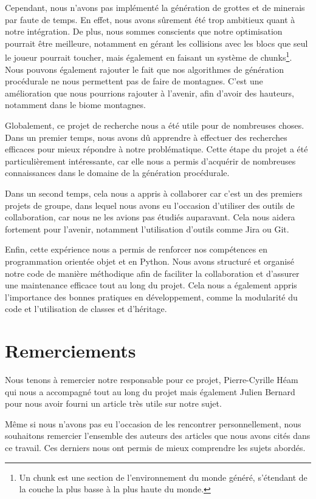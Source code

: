 \documentclass[12pt]{article}
\begin{document}
Cependant, nous n'avons pas implémenté la génération de grottes et de minerais par faute de temps. En effet, nous avons sûrement été trop ambitieux quant à notre intégration. De plus, nous sommes conscients que notre optimisation pourrait être meilleure, notamment en gérant les collisions avec les blocs que seul le joueur pourrait toucher, mais également en faisant un système de chunks\footnote{Un chunk est une section de l’environnement du monde généré, s’étendant de la couche la plus basse à la plus haute du monde.}. Nous pouvons également rajouter le fait que nos algorithmes de génération procédurale ne nous permettent pas de faire de montagnes. C'est une amélioration que nous pourrions rajouter à l'avenir, afin d'avoir des hauteurs, notamment dans le biome montagnes.

Globalement, ce projet de recherche nous a été utile pour de nombreuses choses. Dans un premier temps, nous avons dû apprendre à effectuer des recherches efficaces pour mieux répondre à notre problématique. Cette étape du projet a été particulièrement intéressante, car elle nous a permis d’acquérir de nombreuses connaissances dans le domaine de la génération procédurale.\par
Dans un second temps, cela nous a appris à collaborer car c'est un des premiers projets de groupe, dans lequel nous avons eu l'occasion d'utiliser des outils de collaboration, car nous ne les avions pas étudiés auparavant. Cela nous aidera fortement pour l'avenir, notamment l'utilisation d'outils comme Jira ou Git.\par
Enfin, cette expérience nous a permis de renforcer nos compétences en programmation orientée objet et en Python. Nous avons structuré et organisé notre code de manière méthodique afin de faciliter la collaboration et d’assurer une maintenance efficace tout au long du projet. Cela nous a également appris l’importance des bonnes pratiques en développement, comme la modularité du code et l’utilisation de classes et d’héritage.
\newpage
{}
\section{Remerciements}
Nous tenons à remercier notre responsable pour ce projet, Pierre-Cyrille Héam qui nous a accompagné tout au long du projet mais également Julien Bernard pour nous avoir fourni un article très utile sur notre sujet.\par
Même si nous n’avons pas eu l’occasion de les rencontrer personnellement, nous souhaitons remercier l’ensemble des auteurs des articles que nous avons cités dans ce travail. Ces derniers nous ont permis de mieux comprendre les sujets abordés.
\end{document}
